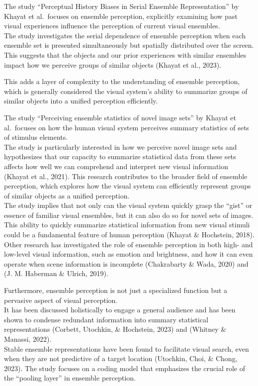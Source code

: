 \documentclass[print]{nuthesis}
\begin{document}
The study ``Perceptual History Biases in Serial Ensemble Representation'' by Khayat et al.~focuses on ensemble perception, explicitly examining how past visual experiences influence the perception of current visual ensembles.\\
The study investigates the serial dependence of ensemble perception when each ensemble set is presented simultaneously but spatially distributed over the screen.\\
This suggests that the objects and our prior experiences with similar ensembles impact how we perceive groups of similar objects (Khayat et al., 2023).

This adds a layer of complexity to the understanding of ensemble perception, which is generally considered the visual system's ability to summarize groups of similar objects into a unified perception efficiently.

The study ``Perceiving ensemble statistics of novel image sets'' by Khayat et al.~focuses on how the human visual system perceives summary statistics of sets of stimulus elements.\\
The study is particularly interested in how we perceive novel image sets and hypothesizes that our capacity to summarize statistical data from these sets affects how well we can comprehend and interpret new visual information (Khayat et al., 2021).
This research contributes to the broader field of ensemble perception, which explores how the visual system can efficiently represent groups of similar objects as a unified perception.\\
The study implies that not only can the visual system quickly grasp the ``gist'' or essence of familiar visual ensembles, but it can also do so for novel sets of images.\\
This ability to quickly summarize statistical information from new visual stimuli could be a fundamental feature of human perception (Khayat \& Hochstein, 2018).\\
Other research has investigated the role of ensemble perception in both high- and low-level visual information, such as emotion and brightness, and how it can even operate when scene information is incomplete (Chakrabarty \& Wada, 2020) and (J. M. Haberman \& Ulrich, 2019).

Furthermore, ensemble perception is not just a specialized function but a pervasive aspect of visual perception.\\
It has been discussed holistically to engage a general audience and has been shown to condense redundant information into summary statistical representations (Corbett, Utochkin, \& Hochstein, 2023) and (Whitney \& Manassi, 2022).\\
Stable ensemble representations have been found to facilitate visual search, even when they are not predictive of a target location (Utochkin, Choi, \& Chong, 2023).
The study focuses on a coding model that emphasizes the crucial role of the ``pooling layer'' in ensemble perception.
\end{document}
